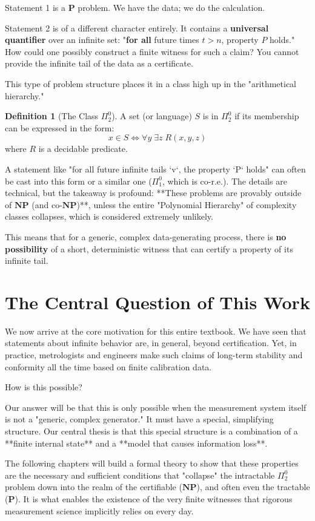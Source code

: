 \documentclass[12pt]{article}
\theoremstyle{definition}
\newtheorem{definition}{Definition}[section]
\begin{document}
Statement 1 is a $\mathbf{P}$ problem. We have the data; we do the calculation.

Statement 2 is of a different character entirely. It contains a \textbf{universal quantifier} over an infinite set: "\textbf{for all} future times $t > n$, property $P$ holds." How could one possibly construct a finite witness for such a claim? You cannot provide the infinite tail of the data as a certificate.

This type of problem structure places it in a class high up in the "arithmetical hierarchy."

\begin{definition}[The Class $\Pi^0_2$]
A set (or language) $S$ is in $\Pi^0_2$ if its membership can be expressed in the form:
\[
x \in S \iff \forall y \; \exists z \; R(x, y, z)
\]
where $R$ is a decidable predicate.
\end{definition}

A statement like "for all future infinite tails `v`, the property `P` holds" can often be cast into this form or a similar one ($\Pi^0_1$, which is co-r.e.). The details are technical, but the takeaway is profound: **These problems are provably outside of $\mathbf{NP}$ (and co-$\mathbf{NP}$)**, unless the entire "Polynomial Hierarchy" of complexity classes collapses, which is considered extremely unlikely.

This means that for a generic, complex data-generating process, there is \textbf{no possibility} of a short, deterministic witness that can certify a property of its infinite tail.

\section{The Central Question of This Work}

We now arrive at the core motivation for this entire textbook. We have seen that statements about infinite behavior are, in general, beyond certification. Yet, in practice, metrologists and engineers make such claims of long-term stability and conformity all the time based on finite calibration data.

How is this possible?

Our answer will be that this is only possible when the measurement system itself is not a "generic, complex generator." It must have a special, simplifying structure. Our central thesis is that this special structure is a combination of a **finite internal state** and a **model that causes information loss**.

The following chapters will build a formal theory to show that these properties are the necessary and sufficient conditions that "collapse" the intractable $\Pi^0_2$ problem down into the realm of the certifiable ($\mathbf{NP}$), and often even the tractable ($\mathbf{P}$). It is what enables the existence of the very finite witnesses that rigorous measurement science implicitly relies on every day.
\end{document}
